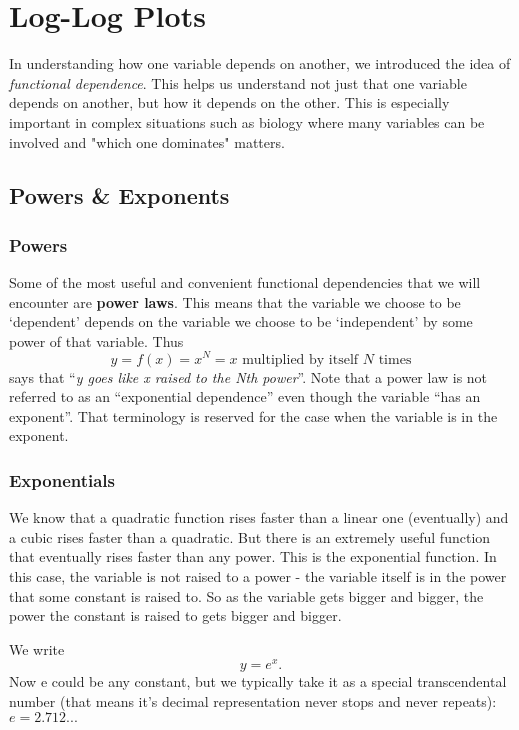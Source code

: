 \chapter{Log-Log Plots}
\thispagestyle{fancy}
\label{chap:log-plots}

In understanding how one variable depends on another, we introduced the idea of \emph{functional dependence}.
This helps us understand not just that one variable depends on another, but how it depends on the other.
This is especially important in complex situations such as biology where many variables can be involved and "which one dominates" matters.

\section{Powers \& Exponents}

\subsection*{Powers}
Some of the most useful and convenient functional dependencies that we will encounter are \textbf{power laws}.
This means that the variable we choose to be `dependent' depends on the variable we choose to be `independent' by some power of that variable.
Thus
\[ y = f(x) = x^{N} = x \text{ multiplied by itself } N \text{ times} \]
says that ``\emph{y goes like x raised to the Nth power}''.
Note that a power law is not referred to as an ``exponential dependence'' even though the variable ``has an exponent''.
That terminology is reserved for the case when the variable is in the exponent.

\subsection*{Exponentials}
We know that a quadratic function rises faster than a linear one (eventually) and a cubic rises faster than a quadratic.
But there is an extremely useful function that eventually rises faster than any power.
This is the exponential function.
In this case, the variable is not raised to a power - the variable itself is in the power that some constant is raised to.
So as the variable gets bigger and bigger, the power the constant is raised to gets bigger and bigger.
\par
We write
\[ y = e^{x} \text{.} \]
Now e could be any constant, but we typically take it as a special transcendental number (that means it's decimal representation never stops and never repeats): $e = 2.712...$

